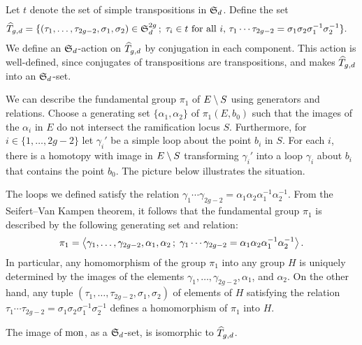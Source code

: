 \begin{defi}
 Let $t$ denote the set of simple transpositions in $\operatorname{\mathfrak{S}}_d$. Define the set
 \begin{align*}
  \widehat{T}_{g,d} = \{(\tau_1,\dotsc,\tau_{2g-2},\sigma_1,\sigma_2)\in \operatorname{\mathfrak{S}}_d^{2g} \,;\; \tau_i\in t \text{ for all $i$, } &\tau_1\dotsm\tau_{2g-2}=\sigma_1\sigma_2\sigma_1^{-1}\sigma_2^{-1}\}.
 \end{align*}
 We define an $\operatorname{\mathfrak{S}}_d$-action on $\widehat{T}_{g,d}$ by conjugation in each component. This action is well-defined, since conjugates of transpositions are transpositions, and makes $\widehat{T}_{g,d}$ into an $\operatorname{\mathfrak{S}}_d$-set.
\end{defi}

\begin{rmk}
 We can describe the fundamental group $\pi_1$ of $E\setminus S$ using generators and relations. Choose a generating set $\{\alpha_1,\alpha_2\}$ of $\pi_1(E,b_0)$ such that the images of the $\alpha_i$ in $E$ do not intersect the ramification locus $S$. Furthermore, for $i\in\{1,\dotsc,2g-2\}$ let $\gamma_i'$ be a simple loop about the point $b_i$ in $S$. For each $i$, there is a homotopy with image in $E\setminus S$ transforming $\gamma_i'$ into a loop $\gamma_i$ about $b_i$ that contains the point $b_0$. The picture below illustrates the situation.
 
 The loops we defined satisfy the relation $\gamma_1\dotsm\gamma_{2g-2}=\alpha_1\alpha_2\alpha_1^{-1}\alpha_2^{-1}$. From the Seifert–Van Kampen theorem, it follows that the fundamental group $\pi_1$ is described by the following generating set and relation:
 \[\pi_1=\left\langle \gamma_1,\dotsc,\gamma_{2g-2},\alpha_1,\alpha_2\,;\; \gamma_1\dotsm\gamma_{2g-2}=\alpha_1\alpha_2\alpha_1^{-1}\alpha_2^{-1} \right\rangle.\]
 In particular, any homomorphism of the group $\pi_1$ into any group $H$ is uniquely determined by the images of the elements $\gamma_1,\dotsc,\gamma_{2g-2},\alpha_1$, and $\alpha_2$. On the other hand, any tuple $(\tau_1,\dotsc,\tau_{2g-2},\sigma_1,\sigma_2)$ of elements of $H$ satisfying the relation $\tau_1\dotsm\tau_{2g-2}=\sigma_1\sigma_2\sigma_1^{-1}\sigma_2^{-1}$ defines a homomorphism of $\pi_1$ into $H$.
\end{rmk}

\begin{prop} \label{pr:classifying-set}
 The image of $\operatorname{mon}$, as a $\operatorname{\mathfrak{S}}_d$-set, is isomorphic to $\widehat{T}_{g,d}$.
\end{prop}

